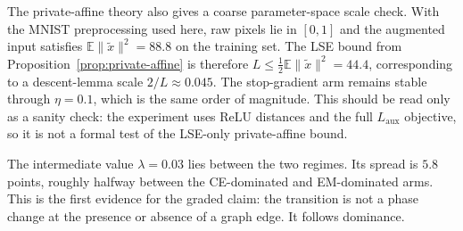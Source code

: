 The private-affine theory also gives a coarse parameter-space scale check.
With the MNIST preprocessing used here, raw pixels lie in $[0,1]$ and the
augmented input satisfies $\mathbb{E}\|\tilde{x}\|^2=88.8$ on the training
set. The LSE bound from Proposition~\ref{prop:private-affine} is therefore
$L\le \tfrac12\mathbb{E}\|\tilde{x}\|^2=44.4$, corresponding to a
descent-lemma scale $2/L\approx0.045$. The stop-gradient arm remains stable
through $\eta=0.1$, which is the same order of magnitude. This should be read
only as a sanity check: the experiment uses ReLU distances and the full
$L_{\mathrm{aux}}$ objective, so it is not a formal test of the LSE-only
private-affine bound.

The intermediate value $\lambda=0.03$ lies between the two regimes. Its spread
is $5.8$ points, roughly halfway between the CE-dominated and EM-dominated
arms. This is the first evidence for the graded claim: the transition is not a
phase change at the presence or absence of a graph edge. It follows dominance.

